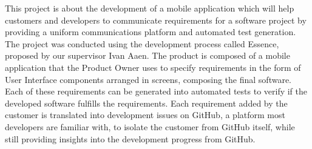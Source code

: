 This project is about the development of a mobile application which will help customers and developers to communicate requirements for a software project by providing a uniform communications platform and automated test generation.
The project was conducted using the development process called Essence, proposed by our supervisor Ivan Aaen.
The product is composed of a mobile application that the Product Owner uses to specify requirements in the form of User Interface components arranged in screens, composing the final software.
Each of these requirements can be generated into automated tests to verify if the developed software fulfills the requirements.
Each requirement added by the customer is translated into development issues on GitHub, a platform most developers are familiar with, to isolate the customer from GitHub itself, while still providing insights into the development progress from GitHub.

